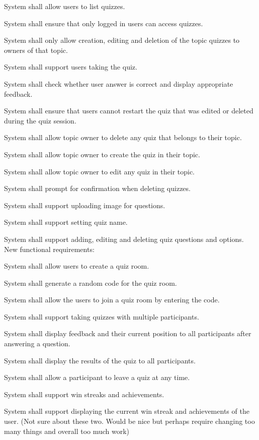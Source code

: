 
\begin{frlist}
    \item System shall allow users to list quizzes.
    \item System shall ensure that only logged in users can access quizzes.
    \item System shall only allow creation, editing and deletion of the topic quizzes to owners of that topic.
    \item System shall support users taking the quiz.
    \item System shall check whether user answer is correct and display appropriate feedback.
    \item System shall ensure that users cannot restart the quiz that was edited or deleted during the quiz session.
    \item System shall allow topic owner to delete any quiz that belongs to their topic.
    \item System shall allow topic owner to create the quiz in their topic.
    \item System shall allow topic owner to edit any quiz in their topic.
    \item System shall prompt for confirmation when deleting quizzes.
    \item System shall support uploading image for questions.
    \item System shall support setting quiz name.
    \item System shall support adding, editing and deleting quiz questions and options.
    New functional requirements:
    \item System shall allow users to create a quiz room.
    \item System shall generate a random code for the quiz room.
    \item System shall allow the users to join a quiz room by entering the code.
    \item System shall support taking quizzes with multiple participants.
    \item System shall display feedback and their current position to all participants after answering a question.
    \item System shall display the results of the quiz to all participants.
    \item System shall allow a participant to leave a quiz at any time.
    \item System shall support win streaks and achievements.
    \item System shall support displaying the current win streak and achievements of the user. (Not sure about these two. Would be nice but perhaps require changing too many things and overall too much work)
\end{frlist}


